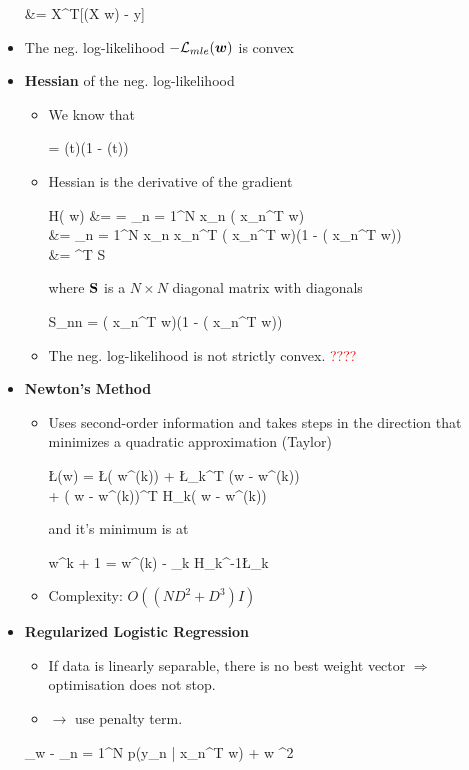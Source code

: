 \begin{itemize}
\begin{myalign*}
	    &= \*X^T[\sigma(\*X \bm w) - \*y]
	\end{myalign*}
	\item The neg. log-likelihood $- \mathcal{L}_{mle}(\bm w)$ is convex
	\item \textbf{Hessian} of the neg. log-likelihood
	\begin{itemize}
		\item We know that
		\begin{myalign*}
		     = \sigma(t)(1 - \sigma(t))
		\end{myalign*}
		\item Hessian is the derivative of the gradient
		\begin{myalign*}
		    \*H(\* w) &=   = \sum_{n = 1}^N  \* x_n \sigma(\* x_n^T \* w) \\
		    &= \sum_{n = 1}^N \* x_n \* x_n^T \sigma(\* x_n^T \* w)(1 - \sigma(\* x_n^T \* w)) \\
		    &= ^T \*S \tilde{\*X}
		\end{myalign*}
		where $\mathbf{S}$ is a $N \times N$ diagonal matrix with diagonals
		\begin{myalign*}
		    S_{nn} = \sigma(\* x_n^T\* w)(1 - \sigma(\* x_n^T \* w))
		\end{myalign*}
		\item The neg. log-likelihood is not strictly convex. \textcolor{red}{????}
	\end{itemize}
	\item \textbf{Newton's Method} %
	\begin{itemize}
		\item Uses second-order information and takes steps in the direction that minimizes a quadratic approximation (Taylor)
		\begin{myalign*}
		    \L(\*w) = \L(\* w^{(k)}) + \*\nabla\L_k^T (\*w - \* w^{(k)})\\ + (\* w - \* w^{(k)})^T \*H_k(\* w - \* w^{(k)})
		\end{myalign*}
		and it's minimum is at
		\begin{myalign*}
		    \* w^{k + 1} =\* w^{(k)} - \gamma_k \*H_k^{-1}\*\nabla\L_k
		\end{myalign*}
		\item Complexity: $O((ND^2 + D^3)I)$
	\end{itemize}
	\item \textbf{Regularized Logistic Regression}
		\begin{itemize}
	    	\item If data is linearly separable, there is no best weight vector $\Rightarrow$ optimisation does not stop.
	    	\item $\rightarrow$ use penalty term.
	    \end{itemize}
	\begin{myalign*}
	    \argmin_{\*w} 
	    	- \sum_{n = 1}^N \ln p(\*y_n | \*x_n^T \* w) +  \lVert \*w \lVert^2
	    \end{myalign*}
\end{itemize}

